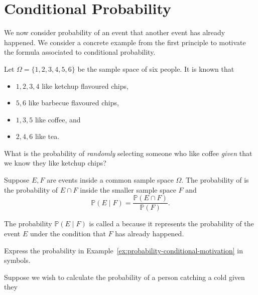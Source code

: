 \documentclass[../main.tex]{subfiles}
\begin{document}
 \section{Conditional Probability}

We now consider probability of an event  that another event has already happened.   We consider a concrete example from the first principle to motivate the formula associated to conditional probability.

\begin{example} \label{ex:probability-conditional-motivation}
  Let \(\Omega = \{1,2,3,4,5,6\}\) be the sample space of six people.  It is known that 
  \begin{itemize}
    \item \(1,2,3,4\) like ketchup flavoured chips,
    \item \(5,6\) like barbecue flavoured chips,
    \item \(1,3,5\) like coffee, and
    \item \(2,4,6\) like tea.
  \end{itemize}

  What is the probability of \emph{randomly} selecting someone who like coffee \emph{given} that we know they like ketchup chips?

\end{example}

\begin{definition}
  Suppose \(E,F\) are events inside a common sample space \(\Omega\).  The probability of  is the probability of \(E \cap F\) inside the smaller sample space \(F\) and
  \[
    \mathbb{P}( E \mid F ) = \frac{\mathbb{P}(E \cap F)}{\mathbb{P}(F)}.
  \]

  The probability \(\mathbb{P}( E \mid F )\) is called a  because it represents the probability of the event \(E\) under the condition that \(F\) has already happened.
\end{definition}

\begin{example}
  Express the probability in Example~\ref{ex:probability-conditional-motivation} in symbols.
\end{example}
\clearpage


\begin{example}
  Suppose we wish to calculate the probability of a person catching a cold given they 
\end{example}
\end{document}
